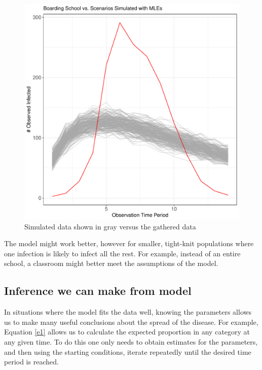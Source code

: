 \documentclass{svproc}
\begin{document}
\begin{figure}
\centering
\includegraphics[scale=.4]{LackOfFit.pdf}
\caption{Simulated data shown in gray versus the gathered data}
\label{plot1}
\end{figure}

The model might work better, however for smaller, tight-knit populations where one infection is likely to infect all the rest. For example, instead of an entire school, a classroom might better meet the assumptions of the model. 

\subsection*{Inference we can make from model}

In situations where the model fits the data well, knowing the parameters allows us to make many useful conclusions about the spread of the disease. For example, Equation \eqref{e1} allows us to calculate the expected proportion in any category at any given time. To do this one only needs to obtain estimates for the parameters, and then using the starting conditions, iterate repeatedly until the desired time period is reached. %
\end{document}
